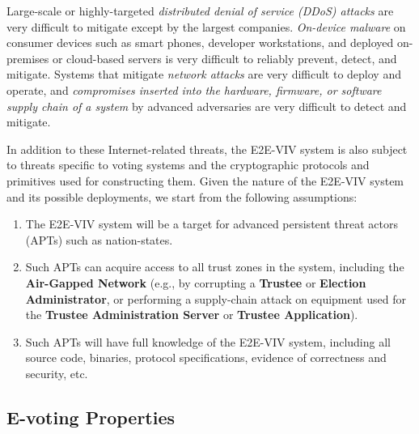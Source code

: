 \documentclass[10pt,letterpaper]{article}
\begin{document}
Large-scale or highly-targeted \emph{distributed denial of service (DDoS) attacks} are very difficult to mitigate except by the largest companies. \emph{On-device malware} on consumer devices such as smart phones, developer workstations, and deployed on-premises or cloud-based servers is very difficult to reliably prevent, detect, and mitigate. Systems that mitigate \emph{network attacks} are very difficult to deploy and operate, and \emph{compromises inserted into the hardware, firmware, or software supply chain of a system} by advanced adversaries are very difficult to detect and mitigate.

In addition to these Internet-related threats, the E2E-VIV system is also subject to threats specific to voting systems and the cryptographic protocols and primitives used for constructing them. Given the nature of the E2E-VIV system and its possible deployments, we start from the following assumptions:

\begin{enumerate}

    \item The E2E-VIV system will be a target for advanced persistent threat actors (APTs) such as nation-states.

    \item Such APTs can acquire access to all trust zones in the system, including the \textbf{Air-Gapped Network} (e.g., by corrupting a \textbf{Trustee} or \textbf{Election Administrator}, or performing a supply-chain attack on equipment used for the \textbf{Trustee Administration Server} or \textbf{Trustee Application}).

    \item Such APTs will have full knowledge of the E2E-VIV system, including all source code, binaries, protocol specifications, evidence of correctness and security, etc.

\end{enumerate}

\subsection{E-voting Properties}
\end{document}
